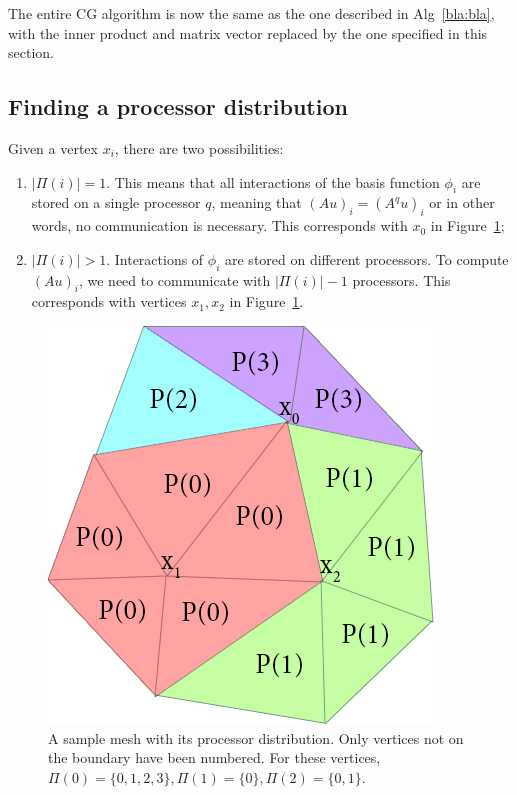 \documentclass[11pt]{amsart}
\theoremstyle{definition}
\begin{document}
The entire CG algorithm is now the same as the one described in Alg~\ref{bla:bla}, with the inner product and matrix vector replaced
by the one specified in this section.
\subsection{Finding a processor distribution}
Given a vertex $x_i$, there are two possibilities:
\begin{enumerate}
  \item $|\Pi(i)| = 1$. This means that all interactions of the basis function $\phi_i$ are stored on a single processor $q$, meaning that $(Au)_i = (A^qu)_i$ or in other words, no communication is necessary. This corresponds with $x_0$ in Figure~\ref{fig:procset};
  \item $|\Pi(i)| > 1$. Interactions of $\phi_i$ are stored on different processors. To compute $(Au)_i$, we need to communicate with $|\Pi(i)|-1$ processors. This corresponds with vertices $x_1, x_2$ in Figure~\ref{fig:procset}.
\end{enumerate}

\begin{figure}
  \includegraphics[width=0.5\linewidth]{procset.png}
  \caption{A sample mesh with its processor distribution. Only vertices not on the boundary have been numbered. For these vertices, $\Pi(0) = \{0, 1, 2, 3\}, \Pi(1) = \{0\}, \Pi(2) = \{0, 1\}$.}
  \label{fig:procset}
\end{figure}
\end{document}
